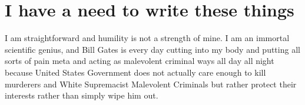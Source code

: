 \documentclass{amsart}
\begin{document}
\section{I have a need to write these things}

I am straightforward and humility is not a strength of mine. I am an immortal scientific genius, and Bill Gates is every day cutting into my body and putting all sorts of pain meta and acting as malevolent criminal ways all day all night because United States Government does not actually care enough to kill murderers and White Supremacist Malevolent Criminals but rather protect their interests rather than simply wipe him out.
\end{document}
